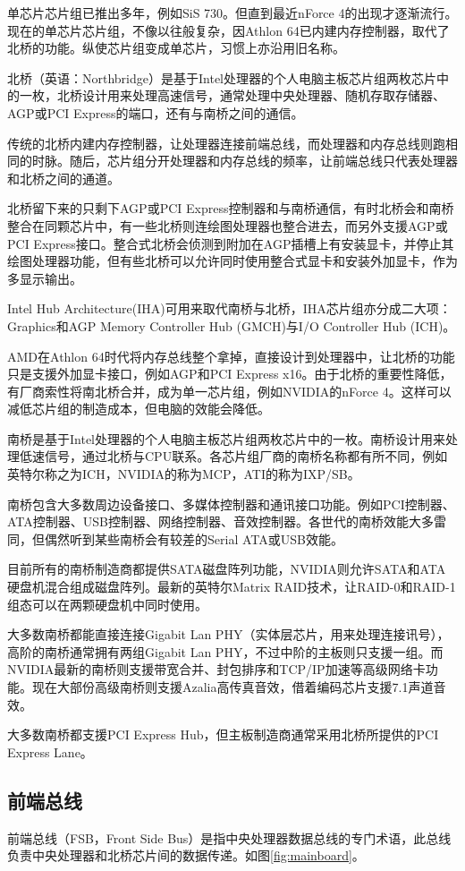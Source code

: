 单芯片芯片组已推出多年，例如SiS 730。但直到最近nForce 4的出现才逐渐流行。现在的单芯片芯片组，不像以往般复杂，因Athlon 64已内建内存控制器，取代了北桥的功能。纵使芯片组变成单芯片，习惯上亦沿用旧名称。

北桥（英语：Northbridge）是基于Intel处理器的个人电脑主板芯片组两枚芯片中的一枚，北桥设计用来处理高速信号，通常处理中央处理器、随机存取存储器、AGP或PCI Express的端口，还有与南桥之间的通信。


传统的北桥内建内存控制器，让处理器连接前端总线，而处理器和内存总线则跑相同的时脉。随后，芯片组分开处理器和内存总线的频率，让前端总线只代表处理器和北桥之间的通道。

北桥留下来的只剩下AGP或PCI Express控制器和与南桥通信，有时北桥会和南桥整合在同颗芯片中，有一些北桥则连绘图处理器也整合进去，而另外支援AGP或PCI Express接口。整合式北桥会侦测到附加在AGP插槽上有安装显卡，并停止其绘图处理器功能，但有些北桥可以允许同时使用整合式显卡和安装外加显卡，作为多显示输出。

Intel Hub Architecture(IHA)可用来取代南桥与北桥，IHA芯片组亦分成二大项：Graphics和AGP Memory Controller Hub (GMCH)与I/O Controller Hub (ICH)。

AMD在Athlon 64时代将内存总线整个拿掉，直接设计到处理器中，让北桥的功能只是支援外加显卡接口，例如AGP和PCI Express x16。由于北桥的重要性降低，有厂商索性将南北桥合并，成为单一芯片组，例如NVIDIA的nForce 4。这样可以减低芯片组的制造成本，但电脑的效能会降低。

南桥是基于Intel处理器的个人电脑主板芯片组两枚芯片中的一枚。南桥设计用来处理低速信号，通过北桥与CPU联系。各芯片组厂商的南桥名称都有所不同，例如英特尔称之为ICH，NVIDIA的称为MCP，ATI的称为IXP/SB。

南桥包含大多数周边设备接口、多媒体控制器和通讯接口功能。例如PCI控制器、ATA控制器、USB控制器、网络控制器、音效控制器。各世代的南桥效能大多雷同，但偶然听到某些南桥会有较差的Serial ATA或USB效能。

目前所有的南桥制造商都提供SATA磁盘阵列功能，NVIDIA则允许SATA和ATA硬盘机混合组成磁盘阵列。最新的英特尔Matrix RAID技术，让RAID-0和RAID-1组态可以在两颗硬盘机中同时使用。

大多数南桥都能直接连接Gigabit Lan PHY（实体层芯片，用来处理连接讯号），高阶的南桥通常拥有两组Gigabit Lan PHY，不过中阶的主板则只支援一组。而NVIDIA最新的南桥则支援带宽合并、封包排序和TCP/IP加速等高级网络卡功能。现在大部份高级南桥则支援Azalia高传真音效，借着编码芯片支援7.1声道音效。

大多数南桥都支援PCI Express Hub，但主板制造商通常采用北桥所提供的PCI Express Lane。
\subsection{前端总线}
前端总线（FSB，Front Side Bus）是指中央处理器数据总线的专门术语，此总线负责中央处理器和北桥芯片间的数据传递。如图\ref{fig:mainboard}。

